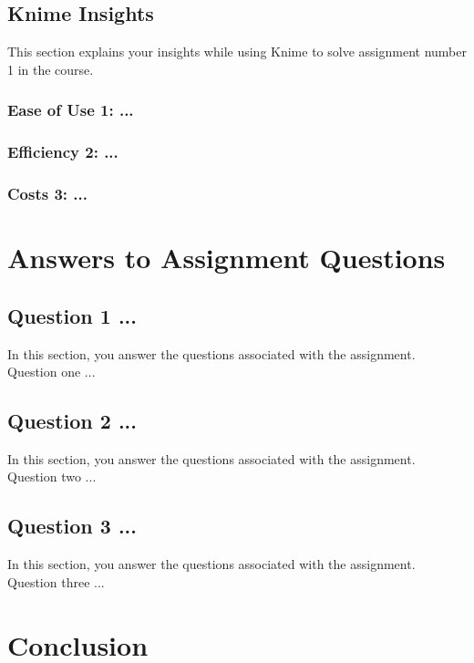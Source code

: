 \documentclass[12p,a4paper]{report}
\begin{document}
\section{Knime Insights}
This section explains your insights while using Knime to solve assignment number 1 in the course. 

\subsection{Ease of Use 1: ...}
    
\subsection{Efficiency 2: ...}
    
\subsection{Costs 3: ...}

\chapter{Answers to Assignment Questions}


\section{Question 1 ...}
In this section, you answer the questions associated with the assignment. Question one ...

\section{Question 2 ...}
In this section, you answer the questions associated with the assignment. Question two ...

\section{Question 3 ...}
In this section, you answer the questions associated with the assignment. Question three ...

\chapter{Conclusion}


\printbibliography
\end{document}
